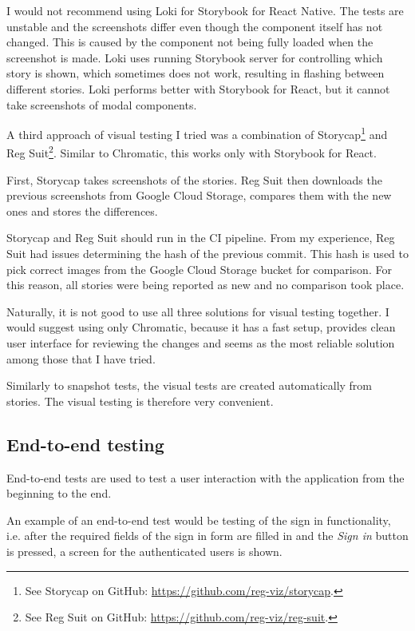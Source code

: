 \documentclass[
  digital, %
  table,   %
  oneside, %
  lof,     %
  lot,     %
]{fithesis3}
\begin{document}
I would not recommend using Loki for Storybook for React Native. The tests are unstable and the screenshots differ even though the component itself has not changed. This is caused by the component not being fully loaded when the screenshot is made. Loki uses running Storybook server for controlling which story is shown, which sometimes does not work, resulting in flashing between different stories.
Loki performs better with Storybook for React, but it cannot take screenshots of modal components.

A third approach of visual testing I tried was a combination of Storycap\footnote{See Storycap on GitHub: \url{https://github.com/reg-viz/storycap}.} and Reg Suit\footnote{See Reg Suit on GitHub: \url{https://github.com/reg-viz/reg-suit}.}. Similar to Chromatic, this works only with Storybook for React.

First, Storycap takes screenshots of the stories. Reg Suit then downloads the previous screenshots from Google Cloud Storage, compares them with the new ones and stores the differences. 

Storycap and Reg Suit should run in the CI pipeline. From my experience, Reg Suit had issues determining the hash of the previous commit. This hash is used to pick correct images from the Google Cloud Storage bucket for comparison. For this reason, all stories were being reported as new and no comparison took place.

Naturally, it is not good to use all three solutions for visual testing together. I would suggest using only Chromatic, because it has a fast setup, provides clean user interface for reviewing the changes and seems as the most reliable solution among those that I have tried.

Similarly to snapshot tests, the visual tests are created automatically from stories. The visual testing is therefore very convenient.

\subsection{End-to-end testing}
\label{sec:end_to_end_testing}
End-to-end tests are used to test a user interaction with the application from the beginning to the end. 

An example of an end-to-end test would be testing of the sign in functionality, i.e. after the required fields of the sign in form are filled in and the \textit{Sign in} button is pressed, a screen for the authenticated users is shown.
\end{document}
